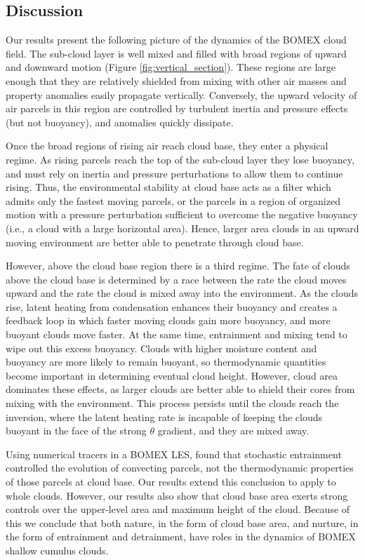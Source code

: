 \documentclass[acp]{copernicus}
\begin{document}
\subsection{Discussion}

Our results present the following picture of the dynamics of the BOMEX cloud 
field.  The sub-cloud layer is well mixed and filled with broad regions of 
upward and downward motion (Figure \ref{fig:vertical_section}).  These regions 
are large enough that they are relatively shielded from mixing with other air 
masses and property anomalies easily propagate vertically.  Conversely, the 
upward velocity of air parcels in this region are controlled by turbulent 
inertia and pressure effects (but not buoyancy), and anomalies quickly 
dissipate.

Once the broad regions of rising air reach cloud base, they enter a physical 
regime.  As rising parcels reach the top of the sub-cloud layer they lose 
buoyancy, and must rely on inertia and pressure perturbations to 
allow them to continue rising.  Thus, the environmental stability at cloud base 
acts as a filter which admits only the fastest moving parcels, or the parcels 
in a region of organized motion with a pressure perturbation sufficient to 
overcome the negative buoyancy (i.e., a cloud with a large horizontal area).  
Hence, larger area clouds in an upward moving environment are better able to
penetrate through cloud base.

However, above the cloud base region there is a third regime.  The fate of 
clouds above the cloud base is determined by a race between the rate the cloud 
moves upward and the rate the cloud is mixed away into the environment.  As the 
clouds rise, latent heating from condensation enhances their buoyancy and 
creates a feedback loop in which faster moving clouds gain more buoyancy, and 
more buoyant clouds move faster.  At the same time, entrainment and mixing 
tend to wipe out this excess buoyancy.  Clouds with higher moisture content and 
buoyancy are more likely to remain buoyant, so thermodynamic quantities become 
important in determining eventual cloud height.  However, cloud area dominates 
these effects, as larger clouds are better able to shield their cores from 
mixing with the environment.  This process persists until the clouds reach the 
inversion, where the latent heating rate is incapable of keeping the clouds 
buoyant in the face of the strong $\theta$ gradient, and they are mixed 
away.

Using numerical tracers in a BOMEX LES, \cite{Romps2010a} found that 
stochastic entrainment controlled the evolution of convecting parcels, not 
the thermodynamic properties of those parcels at cloud base.  Our results 
extend this conclusion to apply to whole clouds.  However, our results also 
show that cloud base area exerts strong controls over the upper-level area and 
maximum height of the cloud.  Because of this we conclude that both nature, in 
the form of cloud base area, and nurture, in the form of entrainment and 
detrainment, have roles in the dynamics of BOMEX shallow cumulus clouds.  
\end{document}
